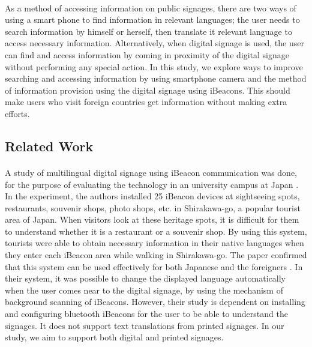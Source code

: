 \documentclass[12pt]{article}
\begin{document}
\paragraph{}As a method of accessing information on public signages, there are two ways of using a smart phone to find information in relevant languages; the user needs to search information by himself or herself, then translate it relevant language to access necessary information. Alternatively, when digital signage is used, the user can find and access information by coming in proximity of the digital signage without performing any special action. In this study, we explore ways to improve searching and accessing information by using smartphone camera and the method of information provision using the digital signage using iBeacons. This should make users who visit foreign countries get information without making extra efforts. 

\subsection{Related Work}

\paragraph{} A study of multilingual digital signage using iBeacon communication was done, for the purpose of evaluating the technology in an university campus at Japan \cite{one}.  In the experiment, the authors installed 25 iBeacon devices at sightseeing spots, restaurants, souvenir shops, photo shops, etc. in Shirakawa-go, a popular tourist area of Japan. When visitors look at these heritage spots, it is difficult for them to understand whether it is a restaurant or a souvenir shop. By using this system, tourists were able to obtain necessary information in their native languages when they enter each iBeacon area while walking in Shirakawa-go. The paper confirmed that this system can be used effectively for both Japanese and the foreigners \cite{one}.  In their system, it was possible to change the displayed language automatically when the user comes near to the digital signage, by using the mechanism of background scanning of iBeacons. However, their study is dependent on installing and configuring bluetooth iBeacons for the user to be able to understand the signages. It does not support text translations from printed signages. In our study, we aim to support both digital and printed signages.
\end{document}
